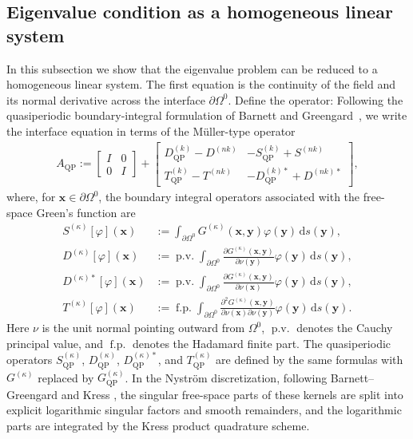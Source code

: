 \documentclass[11pt,fleqn]{article}
\newcommand{\dd}{\mathrm{d}}
\theoremstyle{definition}
\theoremstyle{remark}
\begin{document}
\subsection{Eigenvalue condition as a homogeneous linear system}
In this subsection we show that the eigenvalue problem can be reduced to a homogeneous linear system. The first equation is the continuity of the field and its normal derivative across the interface $\partial \Omega^0$. Define the operator:
Following the quasiperiodic boundary-integral formulation of Barnett and
Greengard~\cite{BarnettGreengard2010}, we write the interface equation in
terms of the Müller-type operator
\begin{align}
A_\mathrm{QP} :=  \begin{bmatrix} I & 0\\ 0 & I \end{bmatrix} 
+ \begin{bmatrix}
  D_\mathrm{QP}^{(k)} - D^{(nk)} & -S_\mathrm{QP}^{(k)} + S^{(nk)}\\
  T_\mathrm{QP}^{(k)} - T^{(nk)} & -D_\mathrm{QP}^{(k)*} + D^{(nk)*}
\end{bmatrix},
\end{align}
where, for $\mathbf{x}\in\partial\Omega^0$, the boundary integral operators associated
with the free-space Green's function are
\begin{align*}
  S^{(\kappa)}[\varphi](\mathbf{x})
  &:= \int_{\partial\Omega^0}
  G^{(\kappa)}(\mathbf{x},\mathbf{y})\varphi(\mathbf{y})\,\dd s(\mathbf{y}),\\
  D^{(\kappa)}[\varphi](\mathbf{x})
  &:= \operatorname{p.v.}\int_{\partial\Omega^0}
  \frac{\partial G^{(\kappa)}(\mathbf{x},\mathbf{y})}{\partial\nu(\mathbf{y})}
  \varphi(\mathbf{y})\,\dd s(\mathbf{y}),\\
  D^{(\kappa)*}[\varphi](\mathbf{x})
  &:= \operatorname{p.v.}\int_{\partial\Omega^0}
  \frac{\partial G^{(\kappa)}(\mathbf{x},\mathbf{y})}{\partial\nu(\mathbf{x})}
  \varphi(\mathbf{y})\,\dd s(\mathbf{y}),\\
  T^{(\kappa)}[\varphi](\mathbf{x})
  &:= \operatorname{f.p.}\int_{\partial\Omega^0}
  \frac{\partial^2 G^{(\kappa)}(\mathbf{x},\mathbf{y})}
  {\partial\nu(\mathbf{x})\partial\nu(\mathbf{y})}
  \varphi(\mathbf{y})\,\dd s(\mathbf{y}).
\end{align*}
Here $\nu$ is the unit normal pointing outward from $\Omega^0$, $\operatorname{p.v.}$
denotes the Cauchy principal value, and $\operatorname{f.p.}$ denotes the Hadamard
finite part. The quasiperiodic operators
$S_{\mathrm{QP}}^{(\kappa)}$, $D_{\mathrm{QP}}^{(\kappa)}$,
$D_{\mathrm{QP}}^{(\kappa)*}$, and $T_{\mathrm{QP}}^{(\kappa)}$ are defined by the
same formulas with $G^{(\kappa)}$ replaced by $G_{\mathrm{QP}}^{(\kappa)}$.
In the Nystr\"om discretization, following Barnett--Greengard and Kress
\cite{BarnettGreengard2010,Kress1991}, the singular free-space parts of these
kernels are split into explicit logarithmic singular factors and smooth
remainders, and the logarithmic parts are integrated by the Kress product
quadrature scheme.
\end{document}
